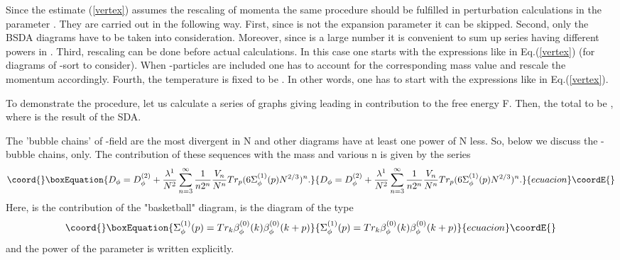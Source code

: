 \documentclass[a4paper,12pt]{article}
\begin{document}
Since the estimate (\ref{vertex}) assumes the rescaling of momenta
\coordHE{} the same procedure should be fulfilled
in perturbation calculations in the parameter \myHighlight{$\epsilon$}\coordHE{}. They are
carried out in the following way. First, since \myHighlight{$\lambda$}\coordHE{} is not the
expansion parameter it can be skipped. Second, only the BSDA diagrams
have to be taken into consideration. Moreover, since \coordHE{} is a large
number it is convenient to sum up series having different powers in
\coordHE{}. Third, rescaling \coordHE{} can be
done before actual calculations. In this case one starts with the
expressions like in Eq.(\ref{vertex}) (for diagrams of \myHighlight{$\phi$}\coordHE{}-sort to
consider). When \myHighlight{$\eta$}\coordHE{}-particles are included one has to account for
the corresponding mass value and rescale the momentum
accordingly. Fourth, the temperature is fixed to be \coordHE{}. In other
words, one has to start with the expressions like in
Eq.(\ref{vertex}).

To demonstrate the procedure, let us calculate a series of graphs
giving leading in \coordHE{} contribution \coordHE{} to the free energy
F. Then, the total to be \coordHE{}, where \coordHE{} is the
result of the SDA.

The 'bubble chains' of \myHighlight{$\phi$}\coordHE{}-field are the most divergent in N and
other diagrams have at least one power of N less. So, below we discuss
the \myHighlight{$\phi$}\coordHE{}- bubble chains, only. The contribution of these sequences
with the mass \coordHE{} and various n is given by the series
\begin{equation}\coord{}\boxEquation{ \label{Df}
D_{\phi} = D_{\phi}^{(2)} + \frac{\lambda^1}{N^2} \sum_{n=3}^{\infty}
\frac{1}{n 2^n}\frac{V_n}{N^n}Tr_p (6 \Sigma^{(1)}_{\phi}(p) N^{2/3})^n.
}{ D_{\phi} = D_{\phi}^{(2)} + \frac{\lambda^1}{N^2} \sum_{n=3}^{\infty}
\frac{1}{n 2^n}\frac{V_n}{N^n}Tr_p (6 \Sigma^{(1)}_{\phi}(p) N^{2/3})^n.
}{ecuacion}\coordE{}\end{equation} 
Here, \coordHE{} is the contribution of the "basketball"
diagram, \coordHE{} is the diagram of the type
\begin{equation}\coord{}\boxEquation{ \label{b}
\Sigma^{(1)}_{\phi}(p) = Tr_k \beta^{(0)}_{\phi}(k) \beta^{(0)}_{\phi}(k+p) 
}{ \Sigma^{(1)}_{\phi}(p) = Tr_k \beta^{(0)}_{\phi}(k) \beta^{(0)}_{\phi}(k+p) 
}{ecuacion}\coordE{}\end{equation}
and the power of the parameter \myHighlight{$\lambda$}\coordHE{} is written explicitly.
\end{document}
